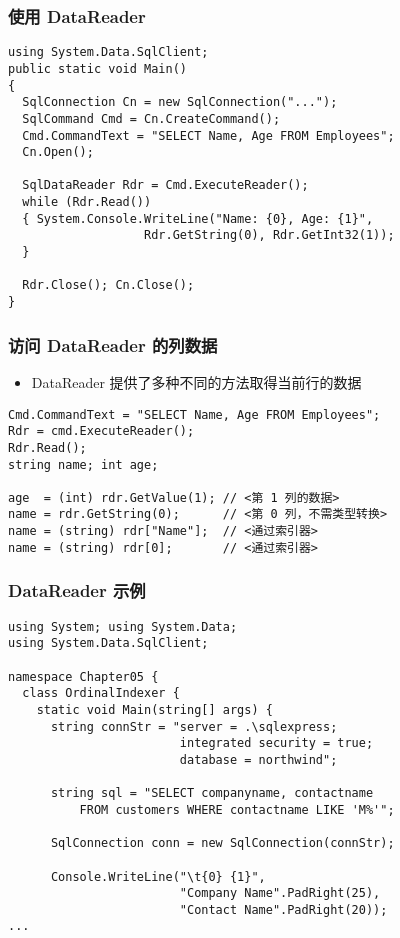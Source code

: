 \begin{frame}[fragile]
\frametitle{使用 DataReader}
\begin{lstlisting}
using System.Data.SqlClient;
public static void Main()
{ 
  SqlConnection Cn = new SqlConnection("...");
  SqlCommand Cmd = Cn.CreateCommand();
  Cmd.CommandText = "SELECT Name, Age FROM Employees";
  Cn.Open();

  SqlDataReader Rdr = Cmd.ExecuteReader();
  while (Rdr.Read())
  { System.Console.WriteLine("Name: {0}, Age: {1}",
                   Rdr.GetString(0), Rdr.GetInt32(1));
  }

  Rdr.Close(); Cn.Close();
}
\end{lstlisting}
\end{frame}

\begin{frame}[fragile]
\frametitle{访问 DataReader 的列数据}
\begin{itemize}
\item DataReader 提供了多种不同的方法取得当前行的数据
\end{itemize}
\begin{lstlisting}[escapeinside=<>]
Cmd.CommandText = "SELECT Name, Age FROM Employees";
Rdr = cmd.ExecuteReader();
Rdr.Read();
string name; int age;

age  = (int) rdr.GetValue(1); // <第 1 列的数据>
name = rdr.GetString(0);      // <第 0 列，不需类型转换>
name = (string) rdr["Name"];  // <通过索引器>
name = (string) rdr[0];       // <通过索引器>

\end{lstlisting}
\end{frame}

\begin{frame}[fragile]
\frametitle{DataReader 示例}
\begin{lstlisting}
using System; using System.Data;
using System.Data.SqlClient;

namespace Chapter05 {
  class OrdinalIndexer {
    static void Main(string[] args) {
      string connStr = "server = .\sqlexpress;
                        integrated security = true;
                        database = northwind";

      string sql = "SELECT companyname, contactname
          FROM customers WHERE contactname LIKE 'M%'";

      SqlConnection conn = new SqlConnection(connStr);

      Console.WriteLine("\t{0} {1}",
                        "Company Name".PadRight(25),
                        "Contact Name".PadRight(20));
...
\end{lstlisting}
\end{frame}

